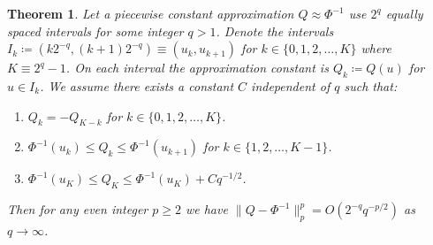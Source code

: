 \documentclass[9pt,a4paper,english]{extarticle}
\newtheorem{theorem}{Theorem}[section]
\begin{document}
\begin{theorem}
\label{thm:piecewise_constant_approximation_error}
Let a piecewise constant approximation $ Q \approx \Phi^{-1} $ use $ 2^q $ equally spaced intervals for some integer $ q > 1 $. Denote the intervals $ I_k \coloneqq (k2^{-q}, (k+1)2^{-q}) \equiv (u_k, u_{k+1}) $ for $ k \in \{0, 1, 2, \ldots, K\} $ where $ K \equiv 2^q - 1 $. On each interval the approximation constant is $ Q_k \coloneqq Q(u) $ for $ u \in I_k $. We assume there exists a constant $ C $ independent of $ q $ such that:
\begin{enumerate}
\item \label{con:symmetry} $ Q_k = -Q_{K-k} $ for $ k \in \{0,1,2,\ldots,K\} $. 
\item \label{con:intermediate_values} $ \Phi^{-1}(u_k) \leq Q_k \leq \Phi^{-1}(u_{k+1}) $ for $ k \in \{1,2, \ldots, K-1\} $.
\item \label{con:bounded_asymptotic_growth} $ \Phi^{-1}(u_K) \leq Q_K \leq \Phi^{-1}(u_K) + Cq^{-1/2} $.
\end{enumerate}
Then for any even integer $ p \geq 2 $ we have $ \lVert  Q - \Phi^{-1} \rVert_p^p = O(2^{-q}q^{-p/2})$ as $ q \rightarrow \infty $.
\end{theorem}
\end{document}
